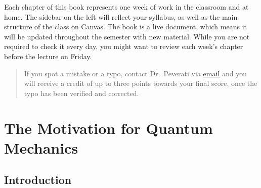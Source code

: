 \documentclass[
  9pt,
]{extbook}
\begin{document}
Each chapter of this book represents one week of work in the classroom and at home. The sidebar on the left will reflect your syllabus, as well as the main structure of the class on Canvas. The book is a live document, which means it will be updated throughout the semester with new material. While you are not required to check it every day, you might want to review each week's chapter before the lecture on Friday.

\begin{quote}
If you spot a mistake or a typo, contact Dr.~Peverati via \href{mailto:rpeverati@fit.edu}{email} and you will receive a credit of up to three points towards your final score, once the typo has been verified and corrected.
\end{quote}

\cleardoublepage
{}

\hypertarget{Motivation}{%
\chapter{The Motivation for Quantum Mechanics}\label{Motivation}}

\hypertarget{introduction}{%
\section{Introduction}\label{introduction}}
\end{document}
